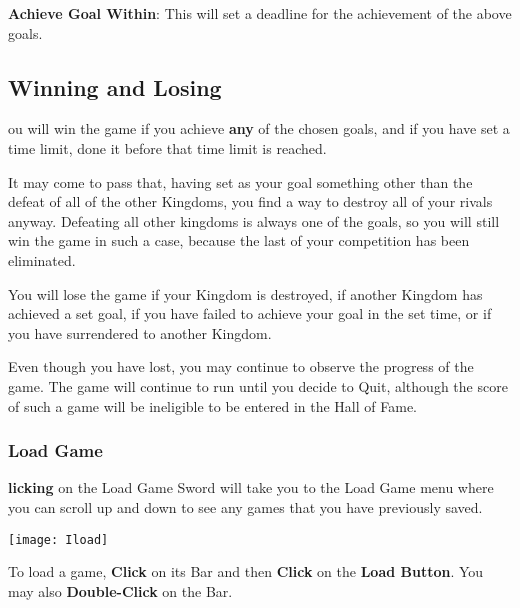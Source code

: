 \textbf{Achieve Goal Within}: This will set a deadline for the achievement of the above goals.

\subsection{Winning and Losing}


ou will win the game if you achieve \textbf{any} of the chosen goals, and if you have set a time limit, done it before that time limit is reached.

It may come to pass that, having set as your goal something other than the defeat of all of the other Kingdoms, you find a way to destroy all of your rivals anyway. Defeating all other kingdoms is always one of the goals, so you will still win the game in such a case, because the last of your competition has been eliminated.

You will lose the game if your Kingdom is destroyed, if another Kingdom has achieved a set goal, if you have failed to achieve your goal in the set time, or if you have surrendered to another Kingdom.


Even though you have lost, you may continue to observe the progress of the game. The game will continue to run until you decide to Quit, although the score of such a game will be ineligible to be entered in the Hall of Fame.

\subsubsection{Load Game}


\textbf{licking} on the Load Game Sword will take you to the Load Game menu where you can scroll up and down to see any games that you have previously saved.

\begin{center}
	\texttt{[image: Iload]} %
\end{center}


To load a game, \textbf{Click} on its Bar and then \textbf{Click} on the \textbf{Load Button}. You may also \textbf{Double-Click} on the Bar.

